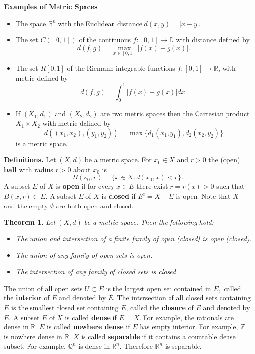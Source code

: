 \documentclass[12pt]{report}
\newtheorem{theorem}{Theorem}[section]
\begin{document}
\medskip
\noindent
\textbf{Examples of Metric Spaces}

\begin{itemize}
\item[1. ] The space $\mathbb{R}^n$ with the Euclidean distance $d(x,
y) = |x-y|$.
\item[2. ] The set $C([0,1])$ of the continuous $ f: [0, 1]
\longrightarrow
\mathbb{C}$ with distance defined by
\[ 
d(f, g) = \max_{x \in [0,1]}  |f(x) - g(x)|.
\]
\item[3. ]  The set $R[0,1]$ of the Riemann integrable functions $f: [0,
1]
\longrightarrow \mathbb{R}$, with metric defined by
\[ 
d(f, g) = \int^1_0 |f(x) - g(x)|dx.
\]
\item[4. ] If $(X_1, d_1)$ and $(X_2, d_2)$ are two metric spaces then
the Cartesian  product $X_1 \times X_2$ with metric defined by 
\[ d((x_1, x_2), (y_1, y_2)) = \max\{ d_1 (x_1, y_1), d_2(x_2,
y_2)\}
\] is a metric space.
\end{itemize}

\bigskip
\noindent
\textbf{Definitions.}  Let $(X, d)$ be a metric space.  For $x_0 \in X$
and $r > 0$ the (open)
\textbf{ball} with radius $r > 0$ about $x_0$ is 
\[ B(x_0, r) = \{x \in X: d(x_0, x) < r\}.
\] A subset $E$ of $X$ is \textbf{open} if for every $x \in E$ there
exist $r = r(x) > 0$ such that $B(x, r) \subset E$.  A subset $E$ of $X$
is \textbf{closed} if $E^c = X - E$ is open.  Note that $X$ and the
empty $\emptyset$ are both open and closed.


\begin{theorem} 
\label{th:metric-topo} Let $(X, d)$ be a metric space. 
Then the following hold:
\begin{itemize}
\item[1.]  The union and intersection of a finite family of open
(closed) is open (closed).
\item[2.]  The union of any family of open sets is open.
\item[3.]  The intersection of any family of closed sets is closed.
\end{itemize}
\end{theorem}
The union of all open sets $U \subset E$ is the largest open
set contained in
$E,$ called the \textbf{interior} of $E$ and denoted by 
$\overset{\circ}{E}$.  The intersection of all closed sets containing
$E$ is  the smallest closed set containing
$E$, called the
\textbf{closure} of $E$ and denoted  by $\bar E$.  A subset $E$ of $X$
is called 
\textbf{dense} if $\bar E = X$.  For example, the rationals are dense
in
$\mathbb{R}$.  $E$ is called \textbf{nowhere dense} if $\bar E$ has
empty interior.  For example, $\mathbb{Z}$ is nowhere dense in
$\mathbb{R}$. $X$ is called
\textbf{separable} if it contains a countable dense subset.  For
example, $\mathbb{Q}^n$ is dense in $\mathbb{R}^n$.  Therefore
$\mathbb{R}^n$ is separable.
\end{document}
